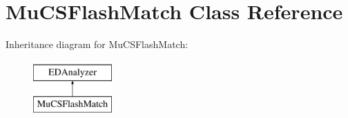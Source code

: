 \hypertarget{classMuCSFlashMatch}{\section{Mu\-C\-S\-Flash\-Match Class Reference}
\label{classMuCSFlashMatch}
}
Inheritance diagram for Mu\-C\-S\-Flash\-Match\-:\begin{figure}[H]
\begin{center}
\leavevmode
\includegraphics[height=2.000000cm]{classMuCSFlashMatch}
\end{center}
\end{figure}
